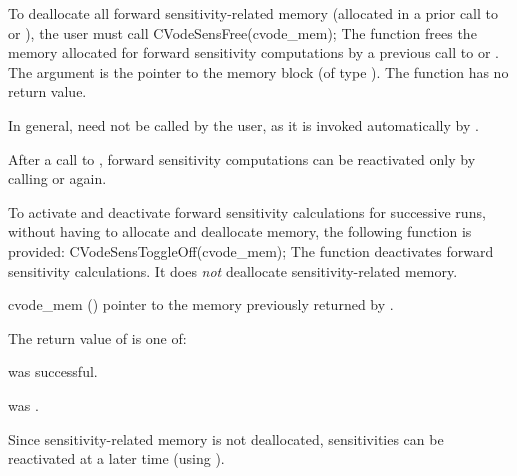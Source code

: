 To deallocate all forward sensitivity-related memory (allocated in a prior call
to  or ), the user must call
{
  CVodeSensFree(cvode\_mem);
}
{
  The function  frees the memory allocated for forward sensitivity 
  computations by a previous call to  or .
}
{
  The argument is the pointer to the {\cvodes} memory block (of type ).
}
{
  The function  has no return value.
}
{
  In general,  need not be called by the user, as it is
  invoked automatically by .

  After a call to , forward sensitivity computations can be reactivated
  only by calling  or  again.
}
To activate and deactivate forward sensitivity calculations for successive {\cvodes} runs,
without having to allocate and deallocate memory, the following function is provided:
{
  CVodeSensToggleOff(cvode\_mem);
}
{
  The function  deactivates forward sensitivity 
  calculations. It does {\em not} deallocate sensitivity-related memory.
}
{
  \begin{args}
  \item[cvode\_mem] ()
    pointer to the memory previously returned by .
  \end{args}
}
{
  The return value  of  is one of:
  \begin{args}
  \item[\Id{CV\_SUCCESS}] 
     was successful.
  \item[\Id{CV\_MEM\_NULL}] 
     was .
  \end{args}
}
{
  Since sensitivity-related memory is not deallocated, sensitivities can
  be reactivated at a later time (using ).
}






